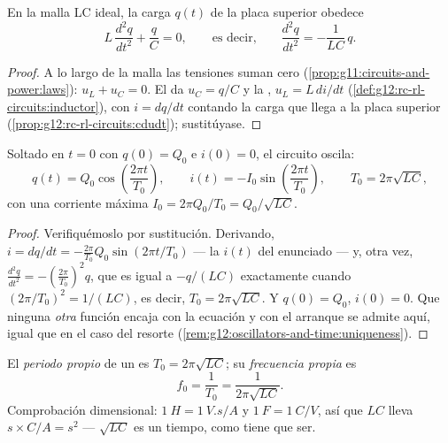 \begin{proposition}\label{prop:g12:rlc-oscillations:equation}
En la malla LC ideal, la carga $q(t)$ de la placa superior obedece
\[
L\,\frac{d^2q}{dt^2} + \frac{q}{C} = 0,
\qquad\text{es decir,}\qquad
\frac{d^2q}{dt^2} = -\frac{1}{LC}\,q .
\]
\end{proposition}

\begin{proof}
A lo largo de la malla las tensiones suman cero
(\cref{prop:g11:circuits-and-power:laws}): $u_L + u_C = 0$. El  da
$u_C = q/C$ y la , $u_L = L\,di/dt$
(\cref{def:g12:rc-rl-circuits:inductor}), con $i = dq/dt$ contando la carga que llega
a la placa superior (\cref{prop:g12:rc-rl-circuits:cdudt}); sustitúyase.
\end{proof}

\begin{theorem}\label{thm:g12:rlc-oscillations:oscillation}
Soltado en $t = 0$ con $q(0) = Q_0$ e $i(0) = 0$, el circuito oscila:
\[
q(t) = Q_0 \cos\!\left(\frac{2\pi t}{T_0}\right),
\qquad
i(t) = -I_0 \sin\!\left(\frac{2\pi t}{T_0}\right),
\qquad
T_0 = 2\pi\sqrt{LC},
\]
con una corriente máxima $I_0 = 2\pi Q_0/T_0 = Q_0/\sqrt{LC}$.
\end{theorem}

\begin{proof}
Verifiquémoslo por sustitución. Derivando,
$i = dq/dt = -\frac{2\pi}{T_0} Q_0 \sin(2\pi t/T_0)$ --- la $i(t)$ del enunciado ---
y, otra vez, $\frac{d^2q}{dt^2} = -(\frac{2\pi}{T_0})^2 q$, que es igual a $-q/(LC)$
exactamente cuando $(2\pi/T_0)^2 = 1/(LC)$, es decir, $T_0 = 2\pi\sqrt{LC}$. Y
$q(0) = Q_0$, $i(0) = 0$. Que ninguna \emph{otra} función encaja con la ecuación y con
el arranque se admite aquí, igual que en el caso del resorte
(\cref{rem:g12:oscillators-and-time:uniqueness}).
\end{proof}

\begin{definition}\label{def:g12:rlc-oscillations:period}
El \emph{periodo propio} de un  es
$T_0 = 2\pi\sqrt{LC}$; su \emph{frecuencia propia} es
\[
f_0 = \frac{1}{T_0} = \frac{1}{2\pi\sqrt{LC}} .
\]
Comprobación dimensional: $\qty{1}{H} = \qty{1}{V.s/A}$ y
$\qty{1}{F} = \qty{1}{C/V}$, así que $LC$ lleva
$\unit{s} \times \unit{C/A} = \unit{s^2}$ --- $\sqrt{LC}$ es un tiempo, como tiene que
ser.
\end{definition}

